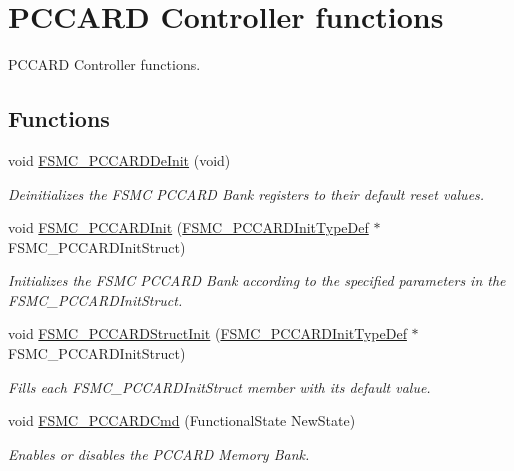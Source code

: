 \hypertarget{group___f_s_m_c___group3}{}\section{P\+C\+C\+A\+R\+D Controller functions}
\label{group___f_s_m_c___group3}


P\+C\+C\+A\+R\+D Controller functions.  


\subsection*{Functions}
\begin{DoxyCompactItemize}
\item 
void \hyperlink{group___f_s_m_c___group3_ga2f53ccf3a4f3c80a5a56fb47ccd47ccd}{F\+S\+M\+C\+\_\+\+P\+C\+C\+A\+R\+D\+De\+Init} (void)
\begin{DoxyCompactList}\small\item\em Deinitializes the F\+S\+M\+C P\+C\+C\+A\+R\+D Bank registers to their default reset values. \end{DoxyCompactList}\item 
void \hyperlink{group___f_s_m_c___group3_gacee1351363e7700a296faa1734a910aa}{F\+S\+M\+C\+\_\+\+P\+C\+C\+A\+R\+D\+Init} (\hyperlink{struct_f_s_m_c___p_c_c_a_r_d_init_type_def}{F\+S\+M\+C\+\_\+\+P\+C\+C\+A\+R\+D\+Init\+Type\+Def} $\ast$F\+S\+M\+C\+\_\+\+P\+C\+C\+A\+R\+D\+Init\+Struct)
\begin{DoxyCompactList}\small\item\em Initializes the F\+S\+M\+C P\+C\+C\+A\+R\+D Bank according to the specified parameters in the F\+S\+M\+C\+\_\+\+P\+C\+C\+A\+R\+D\+Init\+Struct. \end{DoxyCompactList}\item 
void \hyperlink{group___f_s_m_c___group3_ga7a64ba0e0545b3f1913c9d1d28c05e62}{F\+S\+M\+C\+\_\+\+P\+C\+C\+A\+R\+D\+Struct\+Init} (\hyperlink{struct_f_s_m_c___p_c_c_a_r_d_init_type_def}{F\+S\+M\+C\+\_\+\+P\+C\+C\+A\+R\+D\+Init\+Type\+Def} $\ast$F\+S\+M\+C\+\_\+\+P\+C\+C\+A\+R\+D\+Init\+Struct)
\begin{DoxyCompactList}\small\item\em Fills each F\+S\+M\+C\+\_\+\+P\+C\+C\+A\+R\+D\+Init\+Struct member with its default value. \end{DoxyCompactList}\item 
void \hyperlink{group___f_s_m_c___group3_ga2d410151ceb3428c6a1bf374a0472cde}{F\+S\+M\+C\+\_\+\+P\+C\+C\+A\+R\+D\+Cmd} (Functional\+State New\+State)
\begin{DoxyCompactList}\small\item\em Enables or disables the P\+C\+C\+A\+R\+D Memory Bank. \end{DoxyCompactList}\end{DoxyCompactItemize}


